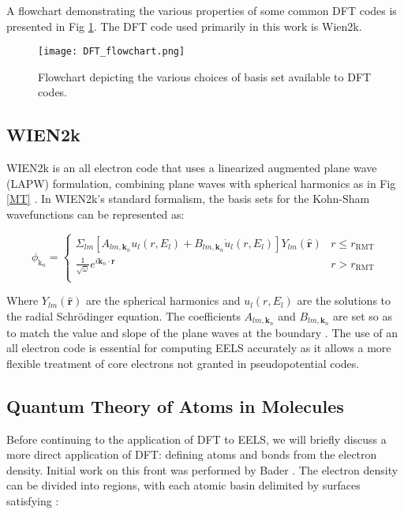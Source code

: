  A flowchart demonstrating the various properties of some common DFT codes is presented in Fig \ref{dft-flowchart}.  The DFT code used primarily in this work is Wien2k.

\begin{figure}
	\centering
	\texttt{[image: DFT\_flowchart.png]}
	\caption{Flowchart depicting the various choices of basis set available to DFT codes.}
	\label{dft-flowchart}
\end{figure}


\subsection{WIEN2k}
WIEN2k is an all electron code that uses a linearized augmented plane wave (LAPW) formulation, combining plane waves with spherical harmonics as in Fig \ref{MT} \cite{wien2k}.   In WIEN2k's standard formalism, the basis sets for the Kohn-Sham wavefunctions can be represented as: 

\begin{equation}
	\phi_{\mathrm{k}_n} = 
	\begin{cases}
	\Sigma_{lm} [A_{lm,\textbf{k}_n}u_l(r,E_l) + B_{lm,\textbf{k}_n}\dot{u}_l(r,E_l)]Y_{lm}(\hat{\textbf{r}}) & r \leq r_{\mathrm{RMT}} \\
	\frac{1}{\sqrt{\omega}}e^{i\textbf{k}_n \cdot \textbf{r}} & r> r_{\mathrm{RMT}} \\
	\end{cases}
\end{equation}

Where $Y_{lm}(\hat{\textbf{r}})$ are the spherical harmonics and $u_l(r,E_l)$ are the solutions to the radial Schr\"odinger equation.  The coefficients $A_{lm,\textbf{k}_n}$ and $B_{lm,\textbf{k}_n}$ are set so as to match the value and slope of the plane waves at the boundary \cite{wien2k}.  The use of an all electron code is essential for computing EELS accurately as it allows a more flexible treatment of core electrons not granted in pseudopotential codes. 
 


\subsection{Quantum Theory of Atoms in Molecules} \label{bader-theory}
Before continuing to the application of DFT to EELS, we will briefly discuss a more direct application of DFT: defining atoms and bonds from the electron density. Initial work on this front was performed by Bader \cite{bader}. The electron density can be divided into regions, with each atomic basin  delimited by surfaces satisfying \cite{bader_quantum_1991}: 


